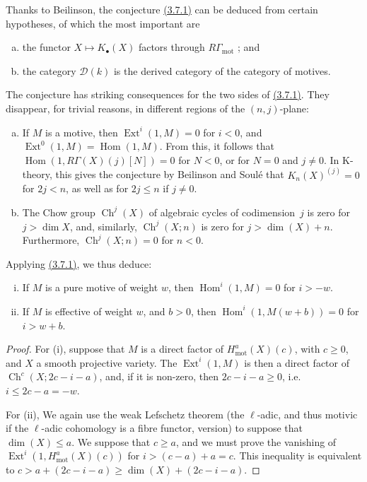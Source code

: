 \documentclass{article}
\theoremstyle{plain}
\newenvironment{nullities}[1]
  {\renewcommand\theinnernullities{#1}\innernullities}
  {\endinnernullities}
\theoremstyle{definition}
\newcommand{\scr}[1]{{\mathscr{#1}}}
\newcommand{\mot}{\mathrm{mot}}
\renewcommand{\geq}{\geqslant}
\renewcommand{\leq}{\leqslant}
\DeclareMathOperator{\Hom}{Hom}
\DeclareMathOperator{\Ext}{Ext}
\DeclareMathOperator{\Ch}{Ch}
\begin{document}
Thanks to Beilinson, the conjecture \hyperref[3.7.1]{(3.7.1)} can be deduced from certain hypotheses, of which the most important are
\begin{enumerate}[(a)]
  \item the functor $X\mapsto K_\bullet(X)$ factors through $R\Gamma_\mot$ ; and
  \item the category $\scr{D}(k)$ is the derived category of the category of motives.
\end{enumerate}
The conjecture has striking consequences for the two sides of \hyperref[3.7.1]{(3.7.1)}.
They disappear, for trivial reasons, in different regions of the $(n,j)$-plane:
\begin{enumerate}[(a)]
  \item If $M$ is a motive, then $\Ext^i(1,M)=0$ for $i<0$, and $\Ext^0(1,M)=\Hom(1,M)$.
    From this, it follows that $\Hom(1,R\Gamma(X)(j)[N])=0$ for $N<0$, or for $N=0$ and $j\neq0$.
    In K-theory, this gives the conjecture by Beilinson and Soul\'{e} that $K_n(X)^{(j)}=0$ for $2j<n$, as well as for $2j\leq n$ if $j\neq0$.
  \item The Chow group $\Ch^j(X)$ of algebraic cycles of codimension~$j$ is zero for $j>\dim X$, and, similarly, $\Ch^j(X;n)$ is zero for $j>\dim(X)+n$.
    Furthermore, $\Ch^j(X;n)=0$ for $n<0$.
\end{enumerate}
Applying \hyperref[3.7.1]{(3.7.1)}, we thus deduce:

\begin{nullities}{3.8.1}
\label{3.8.1}
  \begin{enumerate}[(i)]
    \item If $M$ is a pure motive of weight $w$, then $\Hom^i(1,M)=0$ for $i>-w$.
    \item If $M$ is effective of weight $w$, and $b>0$, then $\Hom^i(1,M(w+b))=0$ for $i>w+b$.
  \end{enumerate}
\end{nullities}

\begin{proof}
  For (i), suppose that $M$ is a direct factor of $H_\mot^a(X)(c)$, with $c\geq0$, and $X$ a smooth projective variety.
  The $\Ext^i(1,M)$ is then a direct factor of $\Ch^c(X;2c-i-a)$, and, if it is non-zero, then $2c-i-a\geq0$, i.e. $i\leq 2c-a=-w$.

  For (ii), We again use the weak Lefschetz theorem (the $\ell$-adic, and thus motivic if the $\ell$-adic cohomology is a fibre functor, version) to suppose that $\dim(X)\leq a$.
  We suppose that $c\geq a$, and we must prove the vanishing of $\Ext^i(1,H_\mot^a(X)(c))$ for $i>(c-a)+a=c$.
  This inequality is equivalent to $c>a+(2c-i-a)\geq\dim(X)+(2c-i-a)$.
\end{proof}
\end{document}
